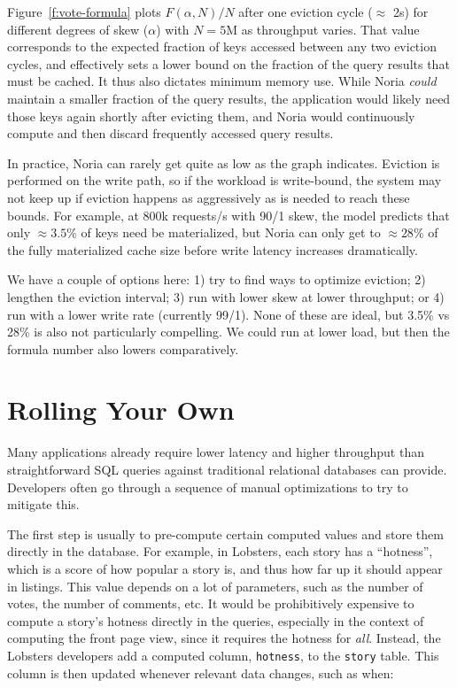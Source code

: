 Figure~\ref{f:vote-formula} plots $F(\alpha, N)/N$ after one eviction cycle
($\approx$ 2s) for different degrees of skew ($\alpha$) with $N=5\text{M}$ as
throughput varies. That value corresponds to the expected fraction of keys
accessed between any two eviction cycles, and effectively sets a lower bound on
the fraction of the query results that must be cached. It thus also dictates
minimum memory use. While Noria \emph{could} maintain a smaller fraction of the
query results, the application would likely need those keys again shortly after
evicting them, and Noria would continuously compute and then discard frequently
accessed query results.

In practice, Noria can rarely get quite as low as the graph indicates. Eviction
is performed on the write path, so if the workload is write-bound, the system
may not keep up if eviction happens as aggressively as is needed to reach these
bounds. For example, at 800k requests/s with 90/1 skew, the model predicts that
only $\approx3.5$\% of keys need be materialized, but Noria can only get to
$\approx28$\% of the fully materialized cache size before write latency
increases dramatically.

\begin{inprogress}
  We have a couple of options here:
    1) try to find ways to optimize eviction;
    2) lengthen the eviction interval;
    3) run with lower skew at lower throughput; or
    4) run with a lower write rate (currently 99/1).
  None of these are ideal, but 3.5\% vs 28\% is also not particularly
  compelling. We could run at lower load, but then the formula number also
  lowers comparatively.
\end{inprogress}

\section{Rolling Your Own}
\label{s:eval:existing}

Many applications already require lower latency and higher throughput than
straightforward SQL queries against traditional relational databases can
provide. Developers often go through a sequence of manual optimizations to try
to mitigate this.

The first step is usually to pre-compute certain computed values and store them
directly in the database. For example, in Lobsters, each story has a
``hotness'', which is a score of how popular a story is, and thus how far up it
should appear in listings. This value depends on a lot of parameters, such as
the number of votes, the number of comments, etc. It would be prohibitively
expensive to compute a story's hotness directly in the queries,
especially in the context of computing the front page view, since it requires
the hotness for \emph{all}. Instead, the Lobsters developers add a computed
column, \texttt{hotness}, to the \texttt{story} table. This column is then
updated whenever relevant data changes, such as when:

